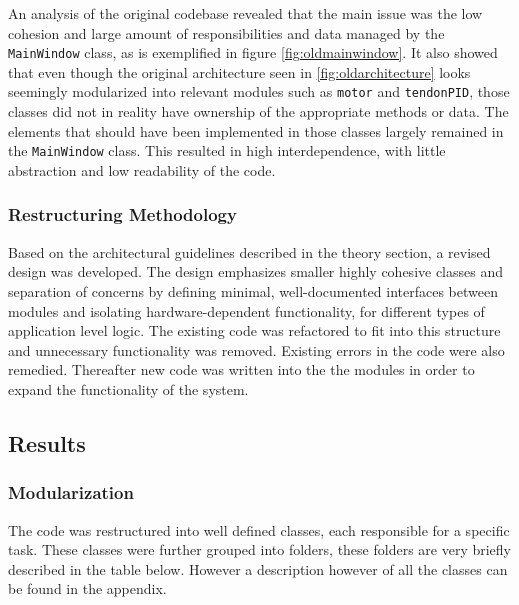 An analysis of the original codebase revealed that the main issue was the low cohesion and large amount of responsibilities and data managed by the \texttt{MainWindow} class, as is exemplified in figure \ref{fig:oldmainwindow}. It also showed that even though the original architecture seen in \ref{fig:oldarchitecture} looks seemingly modularized into relevant modules such as \texttt{motor} and \texttt{tendonPID}, those classes did not in reality have ownership of the appropriate methods or data. The elements that should have been implemented in those classes largely remained in the \texttt{MainWindow} class. This resulted in high interdependence, with little abstraction and low readability of the code.

\subsubsection{Restructuring Methodology}
Based on the architectural guidelines described in the theory section, a revised design was developed. The design emphasizes smaller highly cohesive classes and separation of concerns by defining minimal, well-documented interfaces between modules and isolating hardware-dependent functionality, for different types of application level logic. The existing code was refactored to fit into this structure and unnecessary functionality was removed. Existing errors in the code were also remedied. Thereafter new code was written into the the modules in order to expand the functionality of the system.

\subsection{Results}

\subsubsection{Modularization}
The code was restructured into well defined classes, each responsible for a specific task. These classes were further grouped into folders, these folders are very briefly described in the table below. However a description however of all the classes can be found in the appendix. 

